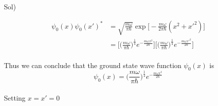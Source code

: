 \documentclass[paper=a4, fontsize=11pt]{scrartcl}
\numberwithin{equation}{section}
\numberwithin{figure}{section}
\numberwithin{table}{section}
\newenvironment{solution}{Sol) \begin{adjustwidth}{0.2in}{}\vspace{0.1in}}{\end{adjustwidth}}
\begin{document}
\begin{solution}
	\begin{equation} 
	\begin{split}
			\psi_0(x) \psi_0(x')^* &=  \sqrt{\frac{m\omega}{\pi\hbar }}  \exp\bigg[ -\frac{m\omega}{2\pi\hbar }(x^2+x'^2)\bigg] \\
			&= \bigg[\bigg(\frac{m\omega}{\pi\hbar }\bigg)^{\frac{1}{4}}e^{-\frac{m\omega x^2 }{ 2\hbar}}\bigg] \bigg[\bigg(\frac{m\omega}{\pi\hbar }\bigg)^{\frac{1}{4}}e^{-\frac{m\omega x'^2 }{ 2\hbar}}\bigg]
	\end{split}
	\end{equation}\\[3pt]
	Thus we can conclude that the ground state wave function $\psi_0(x)$ is\\[3pt]
	\begin{equation}
		\psi_0(x)=\bigg(\frac{m\omega}{\pi\hbar }\bigg)^{\frac{1}{4}}e^{-\frac{m\omega x^2 }{ 2\hbar}}
	\end{equation}\\[3pt]
	Setting $x=x'=0$
\end{solution}


\vskip 0.3in
\end{document}
